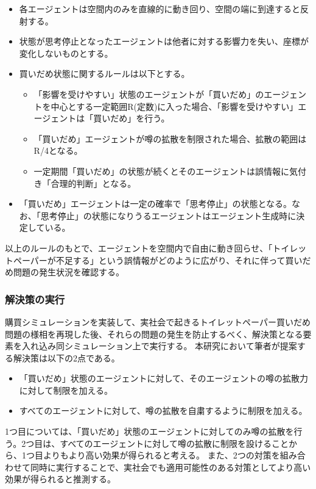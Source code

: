 \begin{itemize}
  \item 各エージェントは空間内のみを直線的に動き回り、空間の端に到達すると反射する。
  \item 状態が思考停止となったエージェントは他者に対する影響力を失い、座標が変化しないものとする。
  \item 買いだめ状態に関するルールは以下とする。
  \begin{itemize}
    \item 「影響を受けやすい」状態のエージェントが「買いだめ」のエージェントを中心とする一定範囲R(定数)に入った場合、「影響を受けやすい」エージェントは「買いだめ」を行う。
    \item 「買いだめ」エージェントが噂の拡散を制限された場合、拡散の範囲はR/4となる。
    \item 一定期間「買いだめ」の状態が続くとそのエージェントは誤情報に気付き「合理的判断」となる。
  \end{itemize}  
  \item 「買いだめ」エージェントは一定の確率で「思考停止」の状態となる。なお、「思考停止」の状態になりうるエージェントはエージェント生成時に決定している。
\end{itemize}

以上のルールのもとで、エージェントを空間内で自由に動き回らせ、「トイレットペーパーが不足する」という誤情報がどのように広がり、それに伴って買いだめ問題の発生状況を確認する。

\subsubsection{解決策の実行}
購買シミュレーションを実装して、実社会で起きるトイレットペーパー買いだめ問題の様相を再現した後、それらの問題の発生を防止するべく、解決策となる要素を入れ込み同シミュレーション上で実行する。
本研究において筆者が提案する解決策は以下の2点である。

\begin{itemize}
  \item 「買いだめ」状態のエージェントに対して、そのエージェントの噂の拡散力に対して制限を加える。
  \item すべてのエージェントに対して、噂の拡散を自粛するように制限を加える。
\end{itemize}

1つ目については、「買いだめ」状態のエージェントに対してのみ噂の拡散を行う。2つ目は、すべてのエージェントに対して噂の拡散に制限を設けることから、1つ目よりもより高い効果が得られると考える。
また、2つの対策を組み合わせて同時に実行することで、実社会でも適用可能性のある対策としてより高い効果が得られると推測する。


